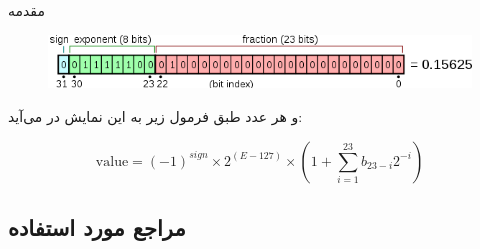 \documentclass[]{article}
\begin{document}
\begin{section-container}{مقدمه}
\begin{figure}[h]
	\centering
	\includegraphics[width=0.8\linewidth]{source/float_example.png}
\end{figure}

و هر عدد طبق فرمول زیر به این نمایش در می‌آید:

\begin{equation}
\text{value} = (-1)^{sign} \times 2^{(E-127)} \times (1 + \sum_{i=1}^{23}b_{23-i}2^{-i})
\end{equation}
 

\subsection{مراجع مورد استفاده}

\end{section-container}
\end{document}
